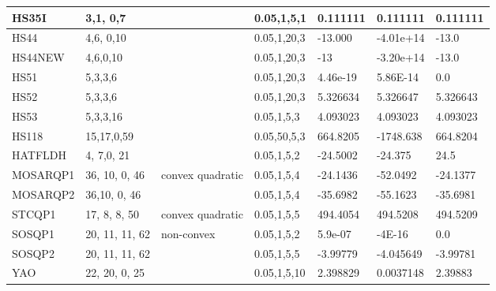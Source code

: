 \begin{landscape}
\begin{longtable}{l | l |  l  |  >{\footnotesize}p{3cm} | l | l | l    }
HS35I   &   3,1, 0,7  &             &   0.05,1,5,1      & 0.111111  & 0.111111   &   0.111111   \\ \hline 
HS44   & 4,6, 0,10   &  	 & 0.05,1,20,3      &  -13.000 & -4.01e+14 & -13.0    \\ \hline
HS44NEW & 4,6,0,10  &     &   0.05,1,20,3    & -13     & -3.20e+14   & -13.0    \\ \hline
HS51    &  5,3,3,6    &  & 0.05,1,20,3      & 4.46e-19   & 5.86E-14     & 0.0    \\ \hline
HS52    &  5,3,3,6   & & 0.05,1,20,3      & 5.326634   & 5.326647   & 5.326643   \\ \hline
HS53    &  5,3,3,16    &   &  0.05,1,5,3  & 4.093023   & 4.093023   & 4.093023  \\ \hline
HS118  & 15,17,0,59  & & 0.05,50,5,3   & 664.8205  & -1748.638  &664.8204    \\ \hline
HATFLDH  & 4, 7,0, 21  & & 0.05,1,5,2  &  -24.5002  & -24.375 & 24.5   \\ \hline

MOSARQP1 & 36, 10, 0, 46 &convex quadratic & 0.05,1,5,4 &  -24.1436 & -52.0492 & -24.1377 \\ \hline
MOSARQP2 &36,10, 0, 46 &  &0.05,1,5,4  & -35.6982  &-55.1623  & -35.6981 \\ \hline
STCQP1  & 17, 8, 8, 50 & convex quadratic  & 0.05,1,5,5& 494.4054  & 494.5208  & 494.5209 \\\hline
SOSQP1 &  20, 11, 11, 62 & non-convex  &  0.05,1,5,2 &5.9e-07 & -4E-16   & 0.0 \\\hline
SOSQP2 &  20, 11, 11, 62 &  &0.05,1,5,5	&  -3.99779  & -4.045649  & -3.99781    \\\hline
YAO   &  22, 20, 0, 25 & & 0.05,1,5,10& 2.398829  & 0.0037148 & 2.39883  \\\hline
\end{longtable}   %
\end{landscape}

